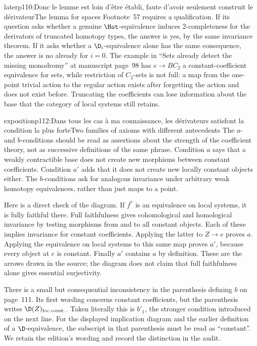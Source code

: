 \begin{dcomment}{later}{p110:Donc le lemme est loin d'être établi, faute d'avoir seulement construit le dérivateur}{The lemma for spaces}
Footnote~57 requires a qualification. If its question asks whether a genuine $\Hot$-equivalence induces 2-completeness for the derivators of truncated homotopy types, the answer is yes, by the same invariance theorem. If it asks whether a $\D_i$-equivalence alone has the same consequence, the answer is no already for $i=0$. The example in ``Sets already detect the missing monodromy'' at manuscript page~98 has $e\to BC_2$ a constant-coefficient equivalence for sets, while restriction of $C_2$-sets is not full: a map from the one-point trivial action to the regular action exists after forgetting the action and does not exist before. Truncating the coefficients can lose information about the base that the category of local systems still retains.
\end{dcomment}

\begin{dcomment}{exposition}{p112:Dans tous les cas à ma connaissance, les dérivateurs satisfont la condition la plus forte}{Two families of axioms with different antecedents}
The $a$- and $b$-conditions should be read as assertions about the strength of the coefficient theory, not as successive definitions of the same phrase. Condition $a$ says that a weakly contractible base does not create new morphisms between constant coefficients. Condition $a'$ adds that it does not create new locally constant objects either. The $b$-conditions ask for analogous invariance under arbitrary weak homotopy equivalences, rather than just maps to a point.

Here is a direct check of the diagram. If $f^*$ is an equivalence on local systems, it is fully faithful there. Full faithfulness gives cohomological and homological invariance by testing morphisms from and to all constant objects. Each of these implies invariance for constant coefficients. Applying the latter to $Z\to e$ proves $a$. Applying the equivalence on local systems to this same map proves $a'$, because every object at $e$ is constant. Finally $a'$ contains $a$ by definition. These are the arrows drawn in the source; the diagram does not claim that full faithfulness alone gives essential surjectivity.

There is a small but consequential inconsistency in the parenthesis defining $b$ on page~111. Its first wording concerns constant coefficients, but the parenthesis writes $\D(Z)_{\mathrm{loc.const.}}$. Taken literally this is $b'_1$, the stronger condition introduced on the next line. For the displayed implication diagram and the earlier definition of a $\D$-equivalence, the subscript in that parenthesis must be read as ``constant''. We retain the edition's wording and record the distinction in the audit.


\end{dcomment}
